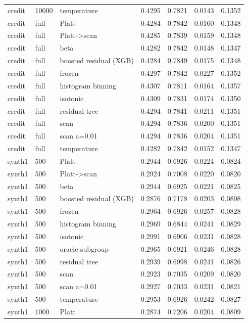 \begin{tabular}{lllrrrr}
credit & 10000 & temperature & 0.4295 & 0.7821 & 0.0143 & 0.1352 \\
credit & full & Platt & 0.4284 & 0.7842 & 0.0160 & 0.1348 \\
credit & full & Platt->scan & 0.4285 & 0.7839 & 0.0159 & 0.1348 \\
credit & full & beta & 0.4282 & 0.7842 & 0.0148 & 0.1347 \\
credit & full & boosted residual (XGB) & 0.4284 & 0.7849 & 0.0175 & 0.1348 \\
credit & full & frozen & 0.4297 & 0.7842 & 0.0227 & 0.1352 \\
credit & full & histogram binning & 0.4307 & 0.7811 & 0.0164 & 0.1357 \\
credit & full & isotonic & 0.4309 & 0.7831 & 0.0174 & 0.1350 \\
credit & full & residual tree & 0.4294 & 0.7841 & 0.0211 & 0.1351 \\
credit & full & scan & 0.4294 & 0.7836 & 0.0200 & 0.1351 \\
credit & full & scan a=0.01 & 0.4294 & 0.7836 & 0.0204 & 0.1351 \\
credit & full & temperature & 0.4282 & 0.7842 & 0.0152 & 0.1347 \\
synth1 & 500 & Platt & 0.2944 & 0.6926 & 0.0224 & 0.0824 \\
synth1 & 500 & Platt->scan & 0.2924 & 0.7008 & 0.0220 & 0.0820 \\
synth1 & 500 & beta & 0.2944 & 0.6925 & 0.0221 & 0.0825 \\
synth1 & 500 & boosted residual (XGB) & 0.2876 & 0.7178 & 0.0203 & 0.0808 \\
synth1 & 500 & frozen & 0.2964 & 0.6926 & 0.0257 & 0.0828 \\
synth1 & 500 & histogram binning & 0.2969 & 0.6844 & 0.0241 & 0.0829 \\
synth1 & 500 & isotonic & 0.2991 & 0.6906 & 0.0231 & 0.0828 \\
synth1 & 500 & oracle subgroup & 0.2965 & 0.6921 & 0.0246 & 0.0828 \\
synth1 & 500 & residual tree & 0.2939 & 0.6998 & 0.0241 & 0.0826 \\
synth1 & 500 & scan & 0.2923 & 0.7035 & 0.0209 & 0.0820 \\
synth1 & 500 & scan a=0.01 & 0.2927 & 0.7033 & 0.0231 & 0.0821 \\
synth1 & 500 & temperature & 0.2953 & 0.6926 & 0.0242 & 0.0827 \\
synth1 & 1000 & Platt & 0.2874 & 0.7206 & 0.0204 & 0.0809 \\

\end{tabular}
